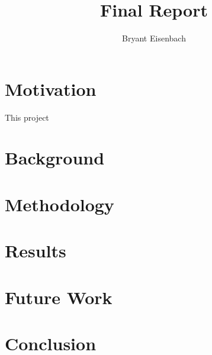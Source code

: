 \documentclass[titlepage]{article}
\author{Bryant Eisenbach}
\title{\project Final Report}
\begin{document}
\section{Motivation}
This project


\section{Background}


\section{Methodology}


\pagebreak
\section{Results}

\section{Future Work}


\section{Conclusion}


\pagebreak
{}

\end{document}
